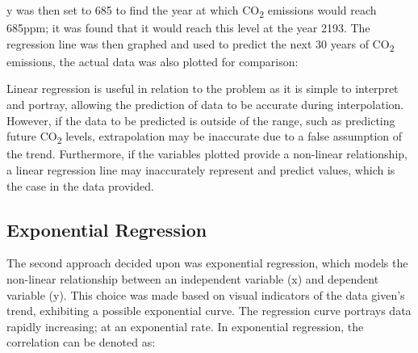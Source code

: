 \documentclass{mcmthesis}
\begin{document}
    {y} was then set to 685 to find the year at which CO\textsubscript{2} emissions would reach 685ppm; it was found that it would reach this level at the year 2193. The regression line was then graphed and used to predict the next 30 years of CO\textsubscript{2} emissions, the actual data was also plotted for comparison:

    \begin{center}
    \end{center}
    
    Linear regression is useful in relation to the problem as it is simple to interpret and portray, allowing the prediction of data to be accurate during interpolation. However, if the data to be predicted is outside of the range, such as predicting future CO\textsubscript{2} levels, extrapolation may be inaccurate due to a false assumption of the trend. Furthermore, if the variables plotted provide a non-linear relationship, a linear regression line may inaccurately represent and predict values, which is the case in the data provided.


    \subsection{Exponential Regression}
    The second approach decided upon was exponential regression, which models the non-linear relationship between an independent variable (x) and dependent variable (y). This choice was made based on visual indicators of the data given’s trend, exhibiting a possible exponential curve. The regression curve portrays data rapidly increasing; at an exponential rate. In exponential regression, the correlation can be denoted as:
\end{document}

